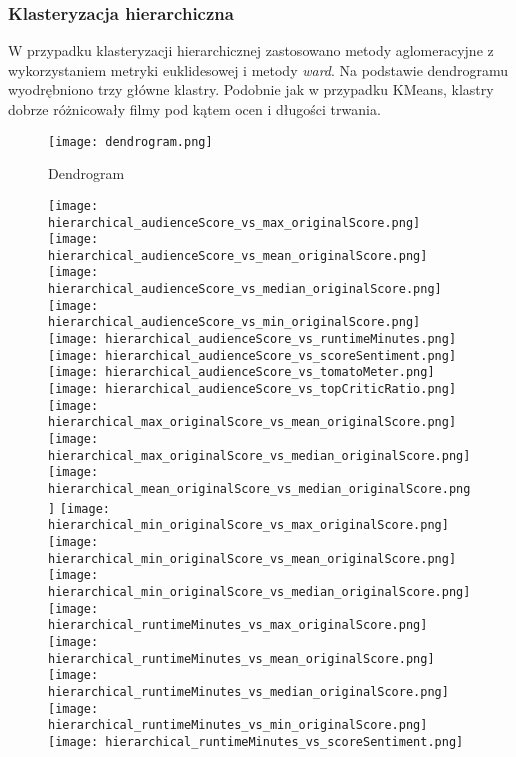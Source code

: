 \documentclass[a4paper,12pt,titlepage]{article}
\begin{document}
\subsubsection{Klasteryzacja hierarchiczna}

W przypadku klasteryzacji hierarchicznej zastosowano metody aglomeracyjne z wykorzystaniem metryki euklidesowej i metody \textit{ward}. Na podstawie dendrogramu wyodrębniono trzy główne klastry. Podobnie jak w przypadku KMeans, klastry dobrze różnicowały filmy pod kątem ocen i długości trwania.

\begin{figure}[H]
\centering
\texttt{[image: dendrogram.png]}
\caption{Dendrogram}
\end{figure}

\begin{figure}[H]
\centering
\texttt{[image: hierarchical\_audienceScore\_vs\_max\_originalScore.png]}
\texttt{[image: hierarchical\_audienceScore\_vs\_mean\_originalScore.png]}
\texttt{[image: hierarchical\_audienceScore\_vs\_median\_originalScore.png]}
\texttt{[image: hierarchical\_audienceScore\_vs\_min\_originalScore.png]}
\texttt{[image: hierarchical\_audienceScore\_vs\_runtimeMinutes.png]}
\texttt{[image: hierarchical\_audienceScore\_vs\_scoreSentiment.png]}
\texttt{[image: hierarchical\_audienceScore\_vs\_tomatoMeter.png]}
\texttt{[image: hierarchical\_audienceScore\_vs\_topCriticRatio.png]}
\texttt{[image: hierarchical\_max\_originalScore\_vs\_mean\_originalScore.png]}
\texttt{[image: hierarchical\_max\_originalScore\_vs\_median\_originalScore.png]}
\texttt{[image: hierarchical\_mean\_originalScore\_vs\_median\_originalScore.png]}
\texttt{[image: hierarchical\_min\_originalScore\_vs\_max\_originalScore.png]}
\texttt{[image: hierarchical\_min\_originalScore\_vs\_mean\_originalScore.png]}
\texttt{[image: hierarchical\_min\_originalScore\_vs\_median\_originalScore.png]}
\texttt{[image: hierarchical\_runtimeMinutes\_vs\_max\_originalScore.png]}
\texttt{[image: hierarchical\_runtimeMinutes\_vs\_mean\_originalScore.png]}
\texttt{[image: hierarchical\_runtimeMinutes\_vs\_median\_originalScore.png]}
\texttt{[image: hierarchical\_runtimeMinutes\_vs\_min\_originalScore.png]}
\texttt{[image: hierarchical\_runtimeMinutes\_vs\_scoreSentiment.png]}

\end{figure}
\end{document}
